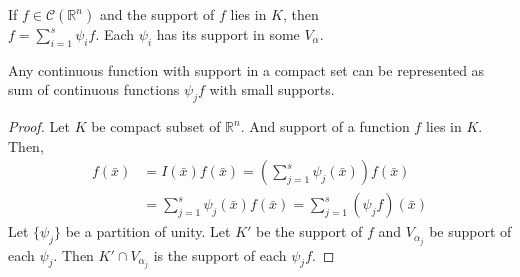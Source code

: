 \begin{corollary}
	If $f \in \mathscr{C}(\mathbb{R}^n)$ and the support of $f$ lies in $K$,
	then\\ $f = \sum\limits_{i=1}^s \psi_i f$. Each $\psi_i$ has its support in some $V_\alpha$.

	\begin{commentary}
		Any continuous function with support in a compact set can be represented as sum of continuous functions $\psi_j f$ with small supports.
	\end{commentary}
\end{corollary}
\begin{proof}
	Let $K$ be compact subset of $\mathbb{R}^n$.
	And support of a function $f$ lies in $K$.
	Then,
	\begin{align*}
		f(\bar{x}) & = I(\bar{x}) f(\bar{x}) = \left( \sum_{j = 1}^s \psi_j(\bar{x}) \right) f(\bar{x}) \\
		& = \sum_{j = 1}^s \psi_j(\bar{x}) f(\bar{x}) = \sum_{j = 1}^s (\psi_j f)(\bar{x})
	\end{align*}
	Let $\{ \psi_j \}$ be a partition of unity.
	Let $K'$ be the support of $f$ and $V_{\alpha_j}$ be support of each $\psi_j$.
	Then $K' \cap V_{\alpha_j}$ is the support of each $\psi_j f$.
\end{proof}

